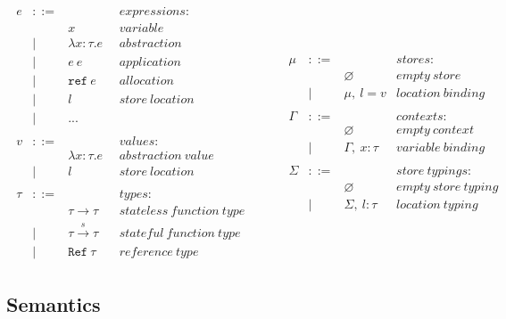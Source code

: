 \documentclass{llncs}
\newcommand{\reftt}{\mathtt{ref}~}
\newcommand{\Reftt}{\mathtt{Ref}~}
\begin{document}
\[
\begin{array}{lll}
\begin{array}{lllr}
e & ::= & & expressions \colon\\
& & x & variable\\
& | & \lambda x : \tau . e & abstraction\\
& | & e~e & application\\
& | & \reftt e & allocation\\
& | & l & store~location\\
& | & ...\\
&&&\\
v & ::= & & values \colon\\
& & \lambda x : \tau . e & abstraction~value\\
& | & l & store~location\\
&&&\\
\tau & ::= & & types \colon\\
& & \tau \rightarrow \tau & stateless~function~type\\
& | & \tau \xrightarrow{s} \tau~~~~& stateful~function~type\\
& | & \Reftt \tau & reference~type
\end{array}
& ~~~~~
&
\begin{array}{lllr}
\mu & ::= & & stores \colon\\
& & \varnothing & empty~store\\
& | & \mu,~l = v & location~binding\\
&&&\\
\Gamma & ::= & & contexts \colon\\
& & \varnothing & empty~context\\
& | & \Gamma,~x : \tau & variable~binding\\
&&&\\
\Sigma & ::= & & store~typings \colon\\
& & \varnothing & empty~store~typing\\
& | & \Sigma,~l : \tau & location~typing
\end{array}
\end{array}
\]


\subsection{Semantics}
\end{document}

